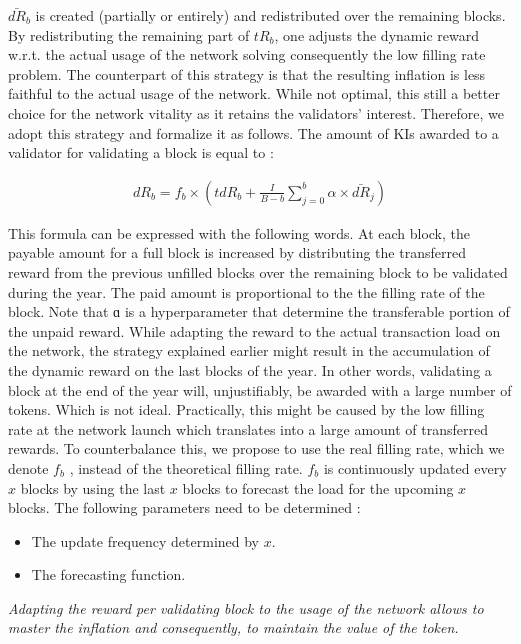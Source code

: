 $\bar{dR}_b$ is created (partially or entirely) and redistributed over the remaining blocks. By redistributing the remaining part of $tR_b$, one adjusts the dynamic reward w.r.t. the actual usage of the network solving consequently the low filling rate problem. The counterpart of  this strategy is that the resulting inflation is less faithful to the actual usage of the network. While not optimal, this still a better choice for the network vitality as it retains the validators' interest. Therefore, we adopt this strategy and formalize it as follows. The amount of KIs awarded to a validator for validating a block is equal to : 
\begin{ceqn}
	\begin{align}
		dR_b=f_b  \times ( tdR_b + \frac{I}{B-b} \sum_{j=0}^{b} \alpha \times \bar{dR}_j)
	\end{align}
\end{ceqn}
This formula can be expressed with the following words. At each block, the payable amount for a full block is increased by distributing the transferred reward from the previous unfilled blocks over the remaining block to be validated during the year. The paid amount is proportional to the the filling rate of the block. Note that ɑ is a hyperparameter that determine the transferable portion of the unpaid reward. 
While adapting the reward to the actual transaction load on the network, the strategy explained earlier might result in the accumulation of the dynamic reward on the last blocks of the year. In other words, validating a block at the end of the year will, unjustifiably,  be awarded with a large number of tokens. Which is not ideal. Practically, this might be caused by the low filling rate at the network launch which translates into a large amount of transferred rewards.  To counterbalance this, we propose to use the real filling rate, which we denote $f_b$ , instead of the theoretical filling rate. $f_b$ is continuously updated every $x$ blocks by using the last $x$ blocks to forecast the load for the upcoming $x$ blocks. The following parameters need to be determined : 

\begin{itemize}
	\item The update frequency determined by $x$.
	\item The forecasting function. 
\end{itemize}

\textit{Adapting the reward per validating block to the usage of the network allows to master the inflation and consequently, to maintain the value of the token.}

